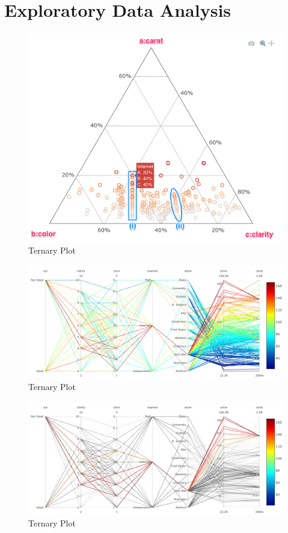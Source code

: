 \documentclass[floatsintext,man]{apa6}
\theoremstyle{definition}
\theoremstyle{definition}
\theoremstyle{definition}
\theoremstyle{remark}
\begin{document}
\section{Exploratory Data Analysis}\label{exploratory-data-analysis}

\begin{figure}
\centering
\includegraphics{../reports/ccc_ternary.png}
\caption{Ternary Plot}
\end{figure}

\begin{figure}
\centering
\includegraphics{../reports/parplot_1.png}
\caption{Ternary Plot}
\end{figure}

\begin{figure}
\centering
\includegraphics{../reports/parplot_3.png}
\caption{Ternary Plot}
\end{figure}
\end{document}

